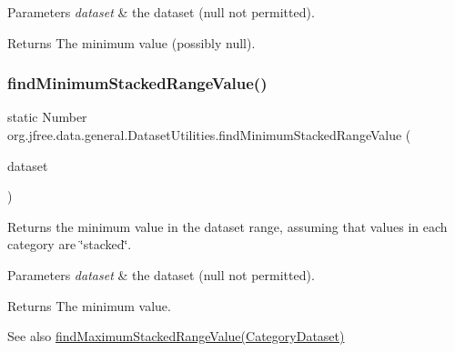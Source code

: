 \begin{DoxyParams}{Parameters}
{\em dataset} & the dataset ({\ttfamily null} not permitted).\\
\hline
\end{DoxyParams}
\begin{DoxyReturn}{Returns}
The minimum value (possibly {\ttfamily null}). 
\end{DoxyReturn}
\mbox{\label{classorg_1_1jfree_1_1data_1_1general_1_1_dataset_utilities_af4c50f8d4c50ba9664952917fc2c308a}} 
\subsubsection{\texorpdfstring{find\+Minimum\+Stacked\+Range\+Value()}{findMinimumStackedRangeValue()}}
{\footnotesize\ttfamily static Number org.\+jfree.\+data.\+general.\+Dataset\+Utilities.\+find\+Minimum\+Stacked\+Range\+Value (\begin{DoxyParamCaption}\item[{\mbox{\hyperlink{interfaceorg_1_1jfree_1_1data_1_1category_1_1_category_dataset}{Category\+Dataset}}}]{dataset }\end{DoxyParamCaption})\hspace{0.3cm}{\ttfamily [static]}}

Returns the minimum value in the dataset range, assuming that values in each category are \char`\"{}stacked\char`\"{}.


\begin{DoxyParams}{Parameters}
{\em dataset} & the dataset ({\ttfamily null} not permitted).\\
\hline
\end{DoxyParams}
\begin{DoxyReturn}{Returns}
The minimum value.
\end{DoxyReturn}
\begin{DoxySeeAlso}{See also}
\mbox{\hyperlink{classorg_1_1jfree_1_1data_1_1general_1_1_dataset_utilities_a70a1d79ab34eb976726f3a647ea4565c}{find\+Maximum\+Stacked\+Range\+Value(\+Category\+Dataset)}} 
\end{DoxySeeAlso}
\mbox{\label{classorg_1_1jfree_1_1data_1_1general_1_1_dataset_utilities_a688e428b19801191aec39518a19265ae}} 

